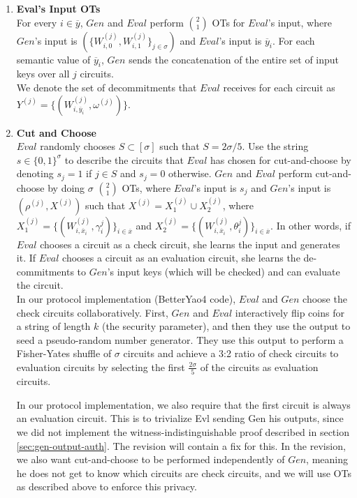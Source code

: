 \documentclass{article}
\begin{document}
\begin{enumerate}
	\item \label{step:eval-inp-ot} \textbf{Eval's Input OTs}\\
	For every $i \in \overline{y}$, $Gen$ and $Eval$ perform ${2 \choose 1}$ OTs for $Eval$'s input, where $Gen$'s input is $(\{W_{i,0}^{(j)},W_{i,1}^{(j)}\}_{j \in \sigma})$ and $Eval$'s input is $\overline{y}_{i}$. For each semantic value of $\overline{y}_{i}$, $Gen$ sends the concatenation of the entire set of input keys over all $j$ circuits.\\
	We denote the set of decommitments that $Eval$ receives for each circuit as $Y^{(j)} = \{ (W_{i,\overline{y}_{i}}^{(j)},\omega^{(j)}) \}$. 
	
	\item \label{step:cut-and-choose} \textbf{Cut and Choose}\\
	$Eval$ randomly chooses $S \subset [\sigma]$ such that $S = 2\sigma / 5$. Use the string $s \in \{0,1\}^{\sigma}$ to describe the circuits that $Eval$ has chosen for cut-and-choose by denoting $s_{j} = 1$ if $j \in S$ and $s_{j} = 0$ otherwise.  $Gen$ and $Eval$ perform cut-and-choose by doing $\sigma$ ${2 \choose 1}$ OTs, where $Eval$'s input is $s_{j}$ and $Gen$'s input is $(\rho^{(j)}, X^{(j)})$ such that $X^{(j)} = X_{1}^{(j)} \cup X_{2}^{(j)}$, where $X_{1}^{(j)} = \{(W_{i,\overline{x}_{i}}^{(j)},\gamma_{i}^{j})\}_{i \in \overline{x}}$ and $X_{2}^{(j)} = \{(W_{i,\overline{x}_{i}}^{(j)},\theta_{i}^{j})\}_{i \in \overline{x}}$. In other words, if $Eval$ chooses a circuit as a check circuit, she learns the input and generates it. If $Eval$ chooses a circuit as an evaluation circuit, she learns the de-commitments to $Gen$'s input keys (which will be checked) and can evaluate the circuit. \\
		
	In our protocol implementation (BetterYao4 code), $Eval$ and $Gen$ choose the check circuits collaboratively. First, $Gen$ and $Eval$ interactively flip coins for a string of length $k$ (the security parameter), and then they use the output to seed a pseudo-random number generator. They use this output to perform a Fisher-Yates shuffle of $\sigma$ circuits and achieve a 3:2 ratio of check circuits to evaluation circuits by selecting the first $\frac{2\sigma}{5}$ of the circuits as evaluation circuits.
	
	In our protocol implementation, we also require that the first circuit is always an evaluation circuit. This is to trivialize Evl sending Gen his outputs, since we did not implement the witness-indistinguishable proof described in section \ref{sec:gen-output-auth}. The revision will contain a fix for this. In the revision, we also want cut-and-choose to be performed independently of $Gen$, meaning he does not get to know which circuits are check circuits, and we will use OTs as described above to enforce this privacy.\\


\end{enumerate}
\end{document}
